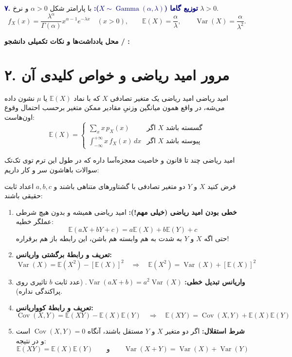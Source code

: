 \documentclass[12pt,a4paper,oneside]{report}
\newcommand{\notespace}{%
  \par\vspace{8pt}%
  \begin{tcolorbox}[breakable=false,colback=white,colframe=muted!50,boxrule=.6pt,arc=1.5mm,height=0.36\textheight]
    \textcolor{muted!70}{\small\textbf{محل یادداشت‌ها و نکات تکمیلی دانشجو / \lr{TA}:}}
  \end{tcolorbox}%
  \par\vspace{8pt}%
}
\newcommand{\E}{\mathbb E}
\newcommand{\Var}{\operatorname{Var}}
\newcommand{\Cov}{\operatorname{Cov}}
\begin{document}
\textbf{\textcolor{navy}{۷. توزیع گاما ($X \sim \operatorname{Gamma}(\alpha, \lambda)$):}}
با پارامتر شکل $\alpha > 0$ و نرخ $\lambda > 0$.
\[
f_X(x) = \frac{\lambda^\alpha}{\Gamma(\alpha)} x^{\alpha-1} e^{-\lambda x} \quad (x > 0), \qquad \E(X) = \frac{\alpha}{\lambda}, \qquad \Var(X) = \frac{\alpha}{\lambda^2}.
\]

\notespace

\clearpage
\section*{۲. مرور امید ریاضی و خواص کلیدی آن}

\begin{definition}{امید ریاضی }
امید ریاضی یک متغیر تصادفی $X$ که با نماد $\E(X)$ یا $\mu$ نشون داده می‌شه، در واقع همون میانگین وزنیِ مقادیر ممکن متغیر برحسب احتمال وقوع اون‌هاست:
\[
\E(X) = \begin{cases}
\displaystyle\sum_x x\,p_X(x) & \text{اگر $X$ گسسته باشد} \\[10pt]
\displaystyle\int_{-\infty}^{+\infty} x\,f_X(x)\,dx & \text{اگر $X$ پیوسته باشد}
\end{cases}
\]
\end{definition}

امید ریاضی چند تا قانون و خاصیت معجزه‌آسا داره که در طول این ترم توی تک‌تک سوالات باهاشون سر و کار داریم:

\begin{reminder}
فرض کنید $X$ و $Y$ دو متغیر تصادفی با گشتاورهای متناهی باشند و $a, b, c$ اعداد ثابت حقیقی باشند:
\begin{enumerate}[itemsep=4pt]
\item \textbf{خطی بودن امید ریاضی (خیلی مهم!):} امید ریاضی همیشه و بدون هیچ شرطی عملگر خطیه:
\[
\E(aX + bY + c) = a\E(X) + b\E(Y) + c
\]
حتی اگه $X$ و $Y$ به شدت به هم وابسته هم باشن، این رابطه باز هم برقراره!
\item \textbf{تعریف و رابطهٔ برگشتی واریانس:}
\[
\Var(X) = \E(X^2) - [\E(X)]^2 \quad\Longrightarrow\quad \E(X^2) = \Var(X) + [\E(X)]^2
\]
\item \textbf{واریانس تبدیل خطی:} $\Var(aX + b) = a^2 \Var(X)$. (عدد ثابت $b$ تاثیری روی پراکندگی نداره).
\item \textbf{تعریف و رابطهٔ کوواریانس:}
\[
\Cov(X, Y) = \E(XY) - \E(X)\E(Y) \quad\Longrightarrow\quad \E(XY) = \Cov(X, Y) + \E(X)\E(Y)
\]
\item \textbf{شرط استقلال:} اگر دو متغیر $X$ و $Y$ مستقل باشند، آنگاه $\Cov(X, Y) = 0$ است و در نتیجه:
\[
\E(XY) = \E(X)\E(Y) \qquad \text{و} \qquad \Var(X + Y) = \Var(X) + \Var(Y)
\]
\end{enumerate}
\end{reminder}
\end{document}
